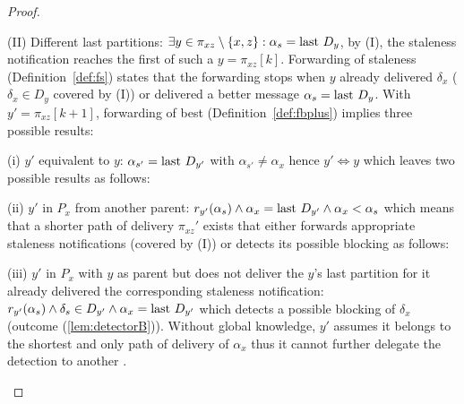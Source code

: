 \begin{proof}
\begin{asparadesc}
  \item[(II) Different last partitions:] $\exists y \in \pi_{xz}
    \setminus \{x, z\}: \alpha_s = \textup{last}~ D_y$, by (I), the staleness
    notification reaches the first of such a \process $y =
    \pi_{xz}[k]$.  Forwarding of staleness (Definition~\ref{def:fs})
    states that the forwarding stops when $y$ already delivered
    $\delta_x$ ($\delta_x \in D_y$ covered by (I)) or delivered a
    better message $\alpha_s = \textup{last}~ D_y$.  With $y'=\pi_{xz}[k+1]$,
    forwarding of best (Definition~\ref{def:fbplus}) implies three
    possible results:
  \begin{asparadesc}
  \item [(i) $y'$ equivalent to $y$:] $\alpha_{s'} = \textup{last}~ D_{y'}$
    with $\alpha_{s'} \neq \alpha_x$ hence $y' \iff y$ which leaves
    two possible results as follows:
  \item [(ii) $y'$ in $P_x$ from another parent:] $r_{y'}(\alpha_s)
    \wedge \alpha_x = \textup{last}~ D_{y'} \wedge \alpha_x < \alpha_s$ which
    means that a shorter path of delivery $\pi_{xz}'$ exists that
    either forwards appropriate staleness notifications (covered by
    (I)) or detects its possible blocking as follows:
  \item [(iii) $y'$ in $P_x$ with $y$ as parent] but does not deliver
    the $y$'s last partition for it already delivered the
    corresponding staleness notification: $r_{y'}(\alpha_s) \wedge
    \delta_s \in D_{y'} \wedge \alpha_x = \textup{last}~ D_{y'}$ which detects
    a possible blocking of $\delta_x$ (outcome
    (\ref{lem:detectorB})). Without global knowledge, $y'$ assumes it
    belongs to the shortest and only path of delivery of $\alpha_x$
    thus it cannot further delegate the detection to another \process.
  \end{asparadesc}
  \end{asparadesc}

\end{proof}
